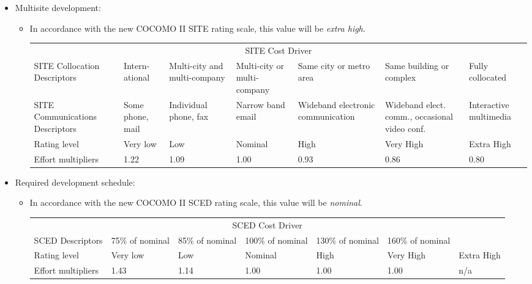 \documentclass[english]{article}
\newenvironment{costdriverstable}[1]{
	\setlength{\LTleft}{-40pt}
	\begin{longtable}{|p{\dimexpr.16\textwidth}|p{\dimexpr.14\textwidth}|p{\dimexpr.14\textwidth}|p{\dimexpr.14\textwidth}|p{\dimexpr.14\textwidth}|p{\dimexpr.14\textwidth}|p{\dimexpr.14\textwidth}|}
	\hline
	\multicolumn{7}{|c|}{{#1}}\\\hhline{|=======|}
}{
	\hline\end{longtable}
}
\newcommand{\costdescriptors}[7]{
	#1 & #2 & #3 & #4 & #5 & #6 & #7\\
}
\newcommand{\ratinglevel}[6]{
	Rating level & #1 & #2 & #3 & #4 & #5 & #6 \\\hline
}
\newcommand{\effortmultipliers}[6]{
	Effort multipliers & #1 & #2 & #3 & #4 & #5 & #6 \\\hline
}
\begin{document}
\begin{itemize}
	\item Multisite development: 
	\begin{itemize}
	\item[]  In accordance with the new COCOMO II SITE rating scale, this value will be \textit{extra high}.
	\pagebreak
	\begin{costdriverstable}{SITE Cost Driver}
		\costdescriptors{SITE Collocation Descriptors}{Intern-ational}{Multi-city and multi-company}{Multi-city or multi-company}{Same city or metro area}{Same building or complex}{Fully collocated}
		\costdescriptors{SITE Communications Descriptors}{Some phone, mail}{Individual phone, fax}{Narrow band email}{Wideband electronic communication}{Wideband elect. comm., occasional video conf.}{Interactive multimedia}\hline
		\ratinglevel{Very low}{Low}{Nominal}{High}{Very High}{Extra High}
		\effortmultipliers{1.22}{1.09}{1.00}{0.93}{0.86}{0.80}		
	\end{costdriverstable}
	
	\end{itemize}
\end{itemize}

\begin{itemize}
	\item Required development schedule: 
	\begin{itemize}
	\item[] In accordance with the new COCOMO II SCED rating scale, this value will be \textit{nominal}.
	\begin{costdriverstable}{SCED Cost Driver}
		\costdescriptors{SCED Descriptors}{75\% of nominal}{85\% of nominal}{100\% of nominal}{130\% of nominal}{160\% of nominal}{}\hline
		\ratinglevel{Very low}{Low}{Nominal}{High}{Very High}{Extra High}
		\effortmultipliers{1.43}{1.14}{1.00}{1.00}{1.00}{n/a}	
	\end{costdriverstable}
	\end{itemize}
\end{itemize}
\end{document}
